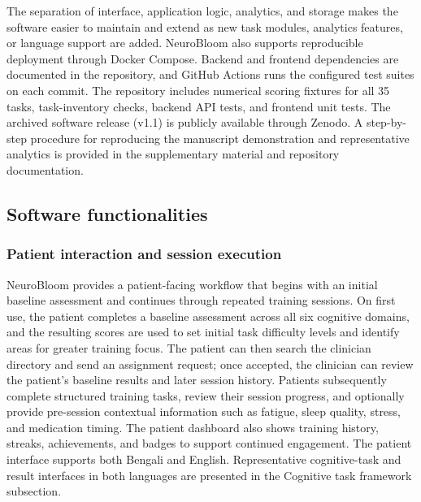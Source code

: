 \documentclass[preprint,12pt,a4paper]{elsarticle}
\begin{document}
The separation of interface, application logic, analytics, and storage
makes the software easier to maintain and extend as new task modules,
analytics features, or language support are added. NeuroBloom also
supports reproducible deployment through Docker Compose. Backend and
frontend dependencies are documented in the repository, and GitHub
Actions runs the configured test suites on each commit. The repository
includes numerical scoring fixtures for all 35 tasks, task-inventory
checks, backend API tests, and frontend unit tests. The archived software release (v1.1) is
publicly available through Zenodo. A step-by-step procedure for reproducing the
manuscript demonstration and representative analytics is provided in the
supplementary material and repository documentation.


\subsection{Software functionalities}

\subsubsection{Patient interaction and session execution}

NeuroBloom provides a patient-facing workflow that begins with an initial
baseline assessment and continues through repeated training sessions. On
first use, the patient completes a baseline assessment across all six
cognitive domains, and the resulting scores are used to set initial task
difficulty levels and identify areas for greater training focus. The patient
can then search the clinician directory and send an assignment request; once
accepted, the clinician can review the patient's baseline results and later
session history. Patients subsequently complete structured training tasks,
review their session progress, and optionally provide pre-session contextual
information such as fatigue, sleep quality, stress, and medication timing.
The patient dashboard also shows training history, streaks, achievements,
and badges to support continued engagement.
The patient interface supports both Bengali and English. Representative
cognitive-task and result interfaces in both languages are presented in the
Cognitive task framework subsection.
\end{document}
